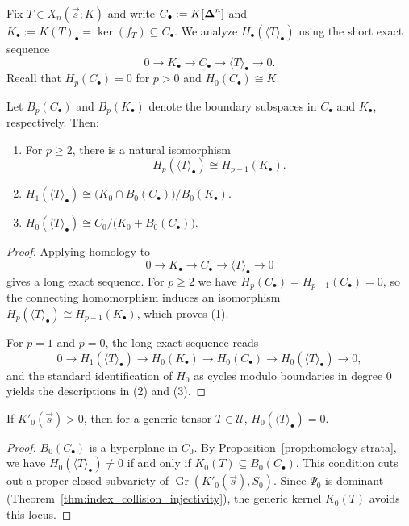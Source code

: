 Fix $T\in X_n(\vec s;K)$ and write $C_\bullet := K[\boldsymbol{\Delta}^n]$ and
$K_\bullet := K(T)_\bullet = \ker(f_T) \subseteq C_\bullet$.
We analyze $H_\bullet(\langle T \rangle_\bullet)$ using the short exact sequence
\[
0 \longrightarrow K_\bullet \longrightarrow C_\bullet \longrightarrow
\langle T \rangle_\bullet \longrightarrow 0.
\]
Recall that $H_p(C_\bullet)=0$ for $p>0$ and $H_0(C_\bullet)\cong K$.

\begin{proposition}\label{prop:homology-strata}
Let $B_p(C_\bullet)$ and $B_p(K_\bullet)$ denote the boundary subspaces in
$C_\bullet$ and $K_\bullet$, respectively. Then:
\begin{enumerate}
    \item For $p\ge 2$, there is a natural isomorphism
          \[
          H_p(\langle T \rangle_\bullet) \cong H_{p-1}(K_\bullet).
          \]
    \item $H_1(\langle T \rangle_\bullet) \cong
          \bigl(K_0 \cap B_0(C_\bullet)\bigr) / B_0(K_\bullet)$.
    \item $H_0(\langle T \rangle_\bullet) \cong
          C_0 / \bigl(K_0 + B_0(C_\bullet)\bigr)$.
\end{enumerate}
\end{proposition}

\begin{proof}
Applying homology to
\[
0 \to K_\bullet \to C_\bullet \to \langle T\rangle_\bullet \to 0
\]
gives a long exact sequence. For $p\ge 2$ we have
$H_p(C_\bullet)=H_{p-1}(C_\bullet)=0$, so the connecting homomorphism
induces an isomorphism $H_p(\langle T\rangle_\bullet)\cong H_{p-1}(K_\bullet)$,
which proves (1).

For $p=1$ and $p=0$, the long exact sequence reads
\[
0 \to H_1(\langle T\rangle_\bullet) \to H_0(K_\bullet) \to H_0(C_\bullet)
\to H_0(\langle T\rangle_\bullet) \to 0,
\]
and the standard identification of $H_0$ as cycles modulo boundaries in degree
$0$ yields the descriptions in (2) and (3).
\end{proof}

\begin{corollary}\label{cor:generic_connectivity}
If $K'_0(\vec s)>0$, then for a generic tensor $T \in \mathcal{U}$,
$H_0(\langle T \rangle_\bullet)=0$.
\end{corollary}

\begin{proof}
$B_0(C_\bullet)$ is a hyperplane in $C_0$. By
Proposition~\ref{prop:homology-strata}, we have
$H_0(\langle T \rangle_\bullet)\ne 0$ if and only if
$K_0(T) \subseteq B_0(C_\bullet)$. This condition cuts out a proper closed
subvariety of $\operatorname{Gr}(K'_0(\vec s),S_0)$. Since $\Psi_0$ is
dominant (Theorem~\ref{thm:index_collision_injectivity}), the generic
kernel $K_0(T)$ avoids this locus.
\end{proof}


